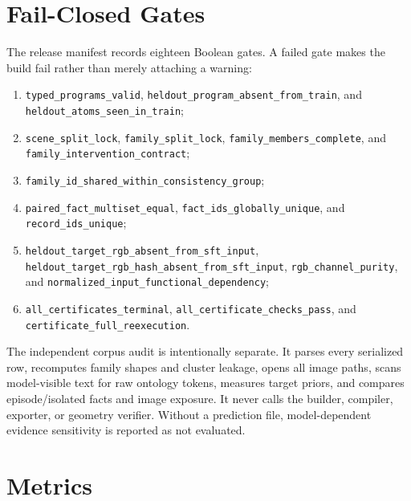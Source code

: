 \section{Fail-Closed Gates}
\label{app:gates}

The release manifest records eighteen Boolean gates.  A failed gate makes the
build fail rather than merely attaching a warning:
\begin{enumerate}
  \item \texttt{typed\_programs\_valid},
        \texttt{heldout\_program\_absent\_from\_train}, and
        \texttt{heldout\_atoms\_seen\_in\_train};
  \item \texttt{scene\_split\_lock}, \texttt{family\_split\_lock},
        \texttt{family\_members\_complete}, and
        \texttt{family\_intervention\_contract};
  \item
        \texttt{family\_id\_shared\_within\_consistency\_group};
  \item \texttt{paired\_fact\_multiset\_equal},
        \texttt{fact\_ids\_globally\_unique}, and
        \texttt{record\_ids\_unique};
  \item \texttt{heldout\_target\_rgb\_absent\_from\_sft\_input},
        \texttt{heldout\_target\_rgb\_hash\_absent\_from\_sft\_input},
        \texttt{rgb\_channel\_purity}, and
        \texttt{normalized\_input\_functional\_dependency};
  \item \texttt{all\_certificates\_terminal},
        \texttt{all\_certificate\_checks\_pass}, and
        \texttt{certificate\_full\_reexecution}.
\end{enumerate}

The independent corpus audit is intentionally separate.  It parses every
serialized row, recomputes family shapes and cluster leakage, opens all image
paths, scans model-visible text for raw ontology tokens, measures target
priors, and compares episode/isolated facts and image exposure.  It never calls
the builder, compiler, exporter, or geometry verifier.  Without a prediction
file, model-dependent evidence sensitivity is reported as not evaluated.

\section{Metrics}
\label{app:metrics}

